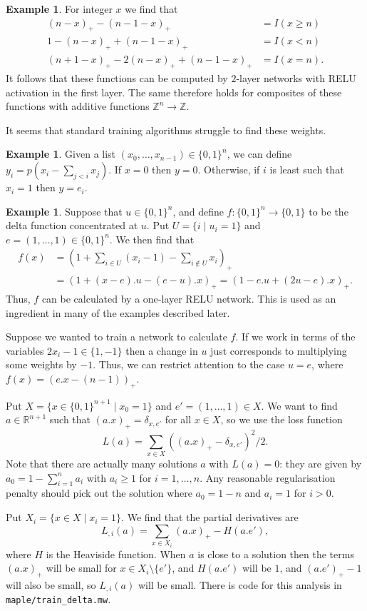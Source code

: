 \documentclass{amsart}
\newcommand{\Z}         {{\mathbb{Z}}}
\newcommand{\R}         {{\mathbb{R}}}
\newcommand{\dl}        {\delta}
\newcommand{\sm}        {\setminus}
\newcommand{\st}        {\;|\;}
\renewcommand{\:}{\colon}
\theoremstyle{definition}
\newtheorem{example}[theorem]{Example}
\begin{document}
\begin{example}\label{eg-intervals}
 For integer $x$ we find that  
 \begin{align*}
  (n-x)_+ - (n-1-x)_+ &= I(x\geq n) \\
  1 - (n-x)_+ + (n-1-x)_+ &= I(x < n) \\
  (n+1-x)_+ - 2(n-x)_+ + (n-1-x)_+ &= I(x = n).
 \end{align*}
 It follows that these functions can be computed by $2$-layer networks
 with RELU activation in the first layer.  The same therefore holds
 for composites of these functions with additive functions
 $\Z^n\to\Z$.

 It seems that standard training algorithms struggle to find these
 weights. 
\end{example}

\begin{example}\label{eg-first}
 Given a list $(x_0,\dotsc,x_{n-1})\in\{0,1\}^n$, we can define
 $y_i=p\left(x_i-\sum_{j<i}x_j\right)$.  If $x=0$ then $y=0$.
 Otherwise, if $i$ is least such that $x_i=1$ then $y=e_i$.
\end{example}

\begin{example}\label{eg-delta}
 Suppose that $u\in\{0,1\}^n$, and define $f\:\{0,1\}^n\to\{0,1\}$ to
 be the delta function concentrated at $u$.  Put $U=\{i\st u_i=1\}$
 and $e=(1,\dotsc,1)\in\{0,1\}^n$.  We then find that 
 \begin{align*}
  f(x) &=
   \left(1+\sum_{i\in U}(x_i-1)-\sum_{i\not\in U}x_i\right)_+  \\
  &= \left(1 + (x - e).u - (e-u).x\right)_+ 
   = \left(1-e.u+(2u-e).x\right)_+.
 \end{align*}
 Thus, $f$ can be calculated by a one-layer RELU network.  This is
 used as an ingredient in many of the examples described later.

 Suppose we wanted to train a network to calculate $f$.  If we work in
 terms of the variables $2x_i-1\in\{1,-1\}$ then a change in $u$ just
 corresponds to multiplying some weights by $-1$.  Thus, we can
 restrict attention to the case $u=e$, where $f(x)=(e.x-(n-1))_+$.  

 Put $X=\{x\in\{0,1\}^{n+1}\st x_0=1\}$ and $e'=(1,\dotsc,1)\in X$.
 We want to find $a\in\R^{n+1}$ such that $(a.x)_+=\dl_{x,e'}$ for all
 $x\in X$, so we use the loss function 
 \[ L(a) = \sum_{x\in X}((a.x)_+-\dl_{x,e'})^2/2. \]
 Note that there are actually many solutions $a$ with $L(a)=0$: they
 are given by $a_0=1-\sum_{i=1}^na_i$ with $a_i\geq 1$ for
 $i=1,\dotsc,n$.  Any reasonable regularisation penalty should pick
 out the solution where $a_0=1-n$ and $a_i=1$ for $i>0$.

 Put $X_i=\{x\in X\st x_i=1\}$.  We find that the partial derivatives
 are 
 \[ L_{,i}(a) = \sum_{x\in X_i}(a.x)_+ - H(a.e'), \]
 where $H$ is the Heaviside function.  When $a$ is close to a solution
 then the terms $(a.x)_+$ will be small for $x\in X_i\sm\{e'\}$, and
 $H(a.e')$ will be $1$, and $(a.e')_+-1$ will also be small, so
 $L_{,i}(a)$ will be small.  There is code for this analysis in
 \texttt{maple/train\_delta.mw}. 
\end{example}
\end{document}

